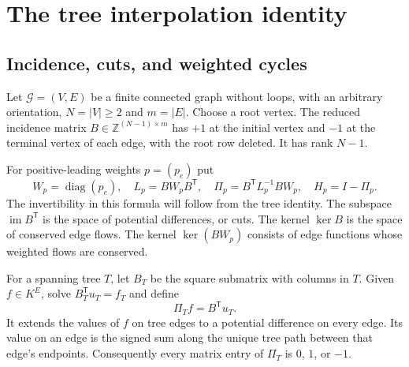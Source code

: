 \documentclass[11pt,a4paper]{article}
\numberwithin{equation}{section}
\theoremstyle{definition}
\newcommand{\Z}{\mathbb Z}
\newcommand{\GG}{\mathcal G}
\newcommand{\im}{\operatorname{im}}
\newcommand{\diag}{\operatorname{diag}}
\begin{document}
\section{The tree interpolation identity}\label{scale:sec:trees}

\subsection{Incidence, cuts, and weighted cycles}
Let $\GG=(V,E)$ be a finite connected graph without loops, with an
arbitrary orientation, $N=|V|\geq2$ and $m=|E|$. Choose a root
vertex. The reduced incidence matrix $B\in\Z^{(N-1)\times m}$ has
$+1$ at the initial vertex and $-1$ at the terminal vertex of each
edge, with the root row deleted. It has rank $N-1$.

For positive-leading weights $p=(p_e)$ put
\begin{equation}\label{scale:eq:projection}
 W_p=\diag(p_e),\quad L_p=BW_pB^{\mathsf T},\quad
 \Pi_p=B^{\mathsf T}L_p^{-1}BW_p,\quad H_p=I-\Pi_p.
\end{equation}
The invertibility in this formula will follow from the tree identity.
The subspace $\im B^{\mathsf T}$ is the space of potential differences,
or cuts. The kernel $\ker B$ is the space of conserved edge flows.
The kernel $\ker(BW_p)$ consists of edge functions whose weighted
flows are conserved.

For a spanning tree $T$, let $B_T$ be the square submatrix with columns
in $T$. Given $f\in K^E$, solve
$B_T^{\mathsf T}u_T=f_T$ and define
\begin{equation}\label{scale:eq:treeinterp}
 \Pi_T f=B^{\mathsf T}u_T.
\end{equation}
It extends the values of $f$ on tree edges to a potential difference
on every edge. Its value on an edge is the signed sum along the
unique tree path between that edge's endpoints. Consequently every
matrix entry of $\Pi_T$ is $0$, $1$, or $-1$.
\end{document}
